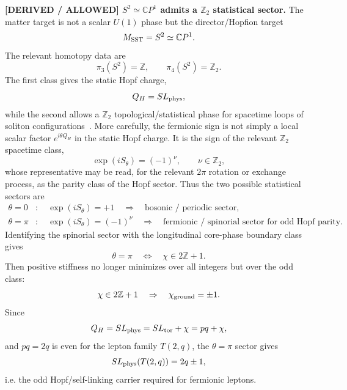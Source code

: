 \documentclass[11pt]{article}
\theoremstyle{definition}
\theoremstyle{plain}
\theoremstyle{remark}
\begin{document}
        \textbf{[DERIVED / ALLOWED] $S^2\simeq\mathbb{C}P^1$ admits a $\mathbb{Z}_2$ statistical sector.}
        The matter target is not a scalar $U(1)$ phase but the director/Hopfion target
        \begin{equation}
            M_{\rm SST}=S^2\simeq\mathbb{C}P^1 .
        \end{equation}
        The relevant homotopy data are
        \begin{equation}
            \pi_3(S^2)=\mathbb{Z},\qquad
            \pi_4(S^2)=\mathbb{Z}_2 .
        \end{equation}
        The first class gives the static Hopf charge,
        \begin{equation}
            Q_H = SL_{\rm phys},
        \end{equation}
        while the second allows a $\mathbb{Z}_2$ topological/statistical phase for spacetime
        loops of soliton configurations~\cite{WilczekZee1983}.  More carefully, the fermionic
        sign is not simply a local scalar factor $e^{i\theta Q_H}$ in the static Hopf charge.
        It is the sign of the relevant $\mathbb{Z}_2$ spacetime class,
        \begin{equation}
            \exp(iS_\theta)=(-1)^\nu,\qquad
            \nu\in\mathbb{Z}_2 ,
        \end{equation}
        whose representative may be read, for the relevant $2\pi$ rotation or exchange process,
        as the parity class of the Hopf sector.  Thus the two possible statistical sectors are
        \begin{align}
            \theta=0 &: \quad \exp(iS_\theta)=+1
                \quad\Rightarrow\quad \text{bosonic / periodic sector},\\
            \theta=\pi &: \quad \exp(iS_\theta)=(-1)^\nu
                \quad\Rightarrow\quad \text{fermionic / spinorial sector for odd Hopf parity}.
        \end{align}
        Identifying the spinorial sector with the longitudinal core-phase boundary class gives
        \begin{equation}
            \theta=\pi
            \quad\Longleftrightarrow\quad
            \chi\in2\mathbb{Z}+1 .
        \end{equation}
        Then positive stiffness no longer minimizes over all integers but over the odd class:
        \begin{equation}
            \chi\in2\mathbb{Z}+1
            \quad\Rightarrow\quad
            \chi_{\rm ground}=\pm1 .
        \end{equation}
        Since
        \begin{equation}
            Q_H=SL_{\rm phys}=SL_{\rm tor}+\chi=pq+\chi,
        \end{equation}
        and $pq=2q$ is even for the lepton family $T(2,q)$, the $\theta=\pi$ sector gives
        \begin{equation}
            SL_{\rm phys}(T(2,q))=2q\pm1,
        \end{equation}
        i.e. the odd Hopf/self-linking carrier required for fermionic leptons.
\end{document}
